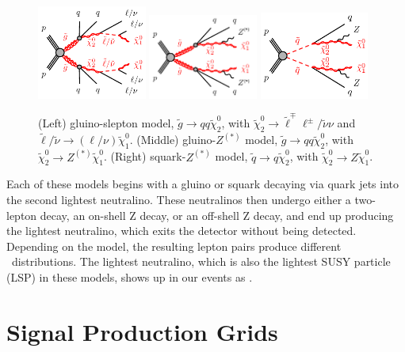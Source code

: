 \begin{figure}[htbp]
    \centering
    \includegraphics[width=0.32\textwidth]{Images/SUSY/gogo-qqqqllllN1N1-N2.pdf}
    \includegraphics[width=0.32\textwidth]{Images/SUSY/gogo-qqqqZZN1N1.pdf}
    \includegraphics[width=0.32\textwidth]{Images/SUSY/sqsq-qqZZN1N1.pdf}
    \caption{(Left) gluino-slepton model, $\tilde{g}\to qq \tilde{\chi}_2^0$, with $\tilde{\chi}_{2}^{0} \to \tilde{\ell}^{\mp}\ell^{\pm} / \tilde{\nu}\nu$ and $\tilde{\ell}/\tilde{\nu} \to (\ell/\nu)\tilde{\chi}_{1}^{0}$. (Middle) gluino-$Z^{(*)}$ model, $\tilde{g}\to qq \tilde{\chi}_2^0$, with $\tilde{\chi}_2^0\rightarrow Z^{(*)} \tilde{\chi}_1^0$. (Right) squark-$Z^{(*)}$ model, $\tilde{q}\to q \tilde{\chi}_2^0$, with $\tilde{\chi}_2^0\rightarrow Z \tilde{\chi}_1^0$.}
    \label{fig:SUSY_models}
\end{figure}

Each of these models begins with a gluino or squark decaying via quark jets into the second lightest neutralino. These neutralinos then undergo either a two-lepton decay, an on-shell Z decay, or an off-shell Z decay, and end up producing the lightest neutralino, which exits the detector without being detected. Depending on the model, the resulting lepton pairs produce different \mll\ distributions. The lightest neutralino, which is also the lightest SUSY particle (LSP) in these models, shows up in our events as \MET.

\section{Signal Production Grids}

